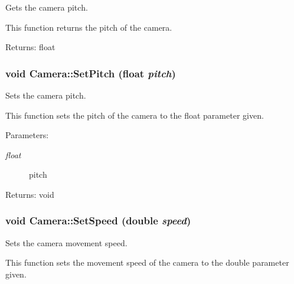 Gets the camera pitch. 

This function returns the pitch of the camera.

\begin{Desc}
\item[Returns:]float \end{Desc}
\hypertarget{class_camera_bd3daba04eb01231eec1d5fdbe862d52}{
\subsubsection[SetPitch]{\setlength{\rightskip}{0pt plus 5cm}void Camera::SetPitch (float {\em pitch})}}
\label{class_camera_bd3daba04eb01231eec1d5fdbe862d52}


Sets the camera pitch. 

This function sets the pitch of the camera to the float parameter given.

\begin{Desc}
\item[Parameters:]
\begin{description}
\item[{\em float}]pitch \end{description}
\end{Desc}
\begin{Desc}
\item[Returns:]void \end{Desc}
\hypertarget{class_camera_8cb555aeca85fcd988978105178cc0f3}{
\subsubsection[SetSpeed]{\setlength{\rightskip}{0pt plus 5cm}void Camera::SetSpeed (double {\em speed})}}
\label{class_camera_8cb555aeca85fcd988978105178cc0f3}


Sets the camera movement speed. 

This function sets the movement speed of the camera to the double parameter given.

